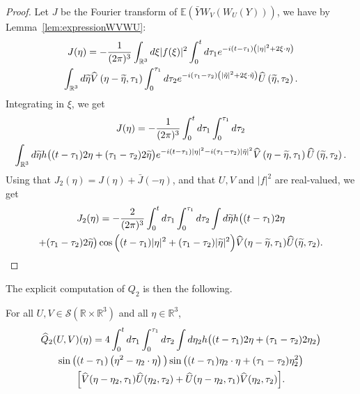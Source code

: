 \documentclass[10pt]{amsart}
\theoremstyle{definition}\newtheorem{defi}[theo]{Definition}\newtheorem{rema}[theo]{Remark}\newtheorem{exam}[theo]{Example}\newtheorem{exem}[theo]{Example}\newtheorem{nota}[theo]{Notation}
\newcommand{\R}{\mathbb{R}}
\newcommand{\E}{\mathbb{E}}
\newcommand{\mclS}{\mathcal{S}}
\let\oldtilde\tilde
\renewcommand*{\tilde}[1]{\mathchoice{\widetilde{#1}}{\widetilde{#1}}{\oldtilde{#1}}{\oldtilde{#1}}}
\let\oldhat\hat
\renewcommand*{\hat}[1]{\mathchoice{\widehat{#1}}{\widehat{#1}}{\oldhat{#1}}{\oldhat{#1}}}
\begin{document}
\begin{proof}
Let $J$ be the Fourier transform of $\E(\bar Y W_V(W_U(Y)))$, we have by Lem\-ma~\ref{lem:expressionWVWU}:
\begin{multline*}
J(\eta) = -\frac{1}{(2\pi)^3} \int_{\R^3} d\xi |f(\xi)|^2 \int_{0}^t d\tau_1 e^{-i (t-\tau_1)\left(|\eta|^2 + 2\xi \cdot \eta\right)}\\ \int_{\R^3} d\tilde{\eta} \hat V\left(\eta-\tilde{\eta},\tau_1\right) 
\int_{0}^{\tau_1} d\tau_2 e^{-i (\tau_1 - \tau_2)\left(|\tilde{\eta}|^2 + 2\xi\cdot \tilde \eta\right)} \hat U \left(\tilde{\eta},\tau_2\right).
\end{multline*}
Integrating in $\xi$, we get
\begin{multline*}
J(\eta) =
-\frac{1}{(2\pi)^3}\int_{0}^t d\tau_1 \int_{0}^{\tau_1} d\tau_2\\
\int_{\R^3} d\tilde{\eta} h\big((t-\tau_1)2\eta + (\tau_1 - \tau_2) 2\tilde{\eta}\big) e^{-i(t-\tau_1) |\eta|^2 -i (\tau_1 - \tau_2)|\tilde{\eta}|^2}
\hat V\left(\eta-\tilde{\eta},\tau_1\right) \hat U \left(\tilde{\eta},\tau_2\right).
\end{multline*}
Using that $J_2(\eta) = J(\eta) + \bar J(-\eta)$, and that $U, V$ and $|f|^2$ are real-valued, we get
\begin{multline*}
J_2(\eta) = -\frac{2}{(2\pi)^3} \int_{0}^t d\tau_1 \int_{0}^{\tau_1} d\tau_2 \int d\tilde{\eta} h\big((t-\tau_1)2\eta \\
+ (\tau_1 - \tau_2) 2\tilde{\eta}\big) \cos\Big((t-\tau_1) |\eta|^2 + (\tau_1 - \tau_2)|\tilde{\eta}|^2\Big) \hat V(\eta-\tilde{\eta},\tau_1) \hat U (\tilde{\eta},\tau_2).\qedhere
\end{multline*}
\end{proof}

The explicit computation of $Q_2$ is then the following.

\begin{prop}
For all $U,V \in \mclS(\R\times \R^3)$ and all $\eta \in \R^3$,
\begin{multline}\label{id:expressionQ2}
\hat Q_2(U,V) (\eta)=
 4 \int_{0}^t d\tau_1 \int_{0}^{\tau_1} d\tau_2 \int d\eta_2 h\big((t-\tau_1)2\eta + (\tau_1 - \tau_2) 2\eta_2\big) \\
\sin \big((t-\tau_1)\left(\eta^2-\eta_2\cdot \eta\right)\big) \sin\big((t-\tau_1)\eta_2\cdot \eta + (\tau_1 - \tau_2)\eta_2^2\big) \\
\Big[\hat V(\eta-\eta_2,\tau_1) \hat U (\eta_2,\tau_2) + \hat U(\eta-\eta_2,\tau_1) \hat V (\eta_2,\tau_2) \Big].
\end{multline}
\end{prop}
\end{document}
